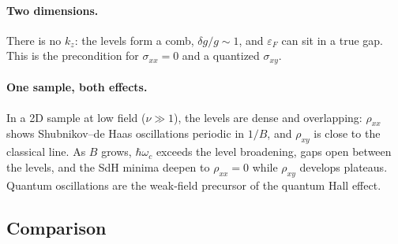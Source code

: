 \paragraph{Two dimensions.} There is no $k_z$: the levels form a comb, $\delta g/g\sim1$, and $\varepsilon_F$ can sit in a true gap. This is the precondition for $\sigma_{xx} = 0$ and a quantized $\sigma_{xy}$.

\paragraph{One sample, both effects.} In a 2D sample at low field ($\nu\gg1$), the levels are dense and overlapping: $\rho_{xx}$ shows Shubnikov--de Haas oscillations periodic in $1/B$, and $\rho_{xy}$ is close to the classical line. As $B$ grows, $\hbar\omega_c$ exceeds the level broadening, gaps open between the levels, and the SdH minima deepen to $\rho_{xx} = 0$ while $\rho_{xy}$ develops plateaus. Quantum oscillations are the weak-field precursor of the quantum Hall effect.

\subsection{Comparison}

